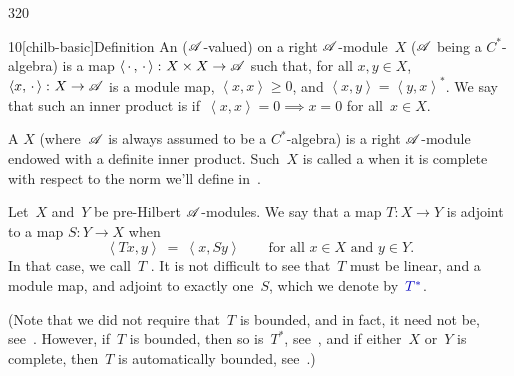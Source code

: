 \begin{parsec}{320}%
\begin{point}{10}[chilb-basic]{Definition}%
	An ($\mathscr{A}$-valued)
	on a right $\mathscr{A}$-module~$X$
($\mathscr{A}$ being a $C^*$-algebra) is a map
$\left<\,\cdot\,,\,\cdot\,\right>\colon X\times X\to\mathscr{A}$%
such that, for all $x,y\in X$,
$\left<x,\,\cdot\,\right>\colon X\to \mathscr{A}$
is a module map, $\left<x,x\right>\geq 0$,
and $\left<x,y\right>=\left<y,x\right>^*$.
We say that such an inner product is %
if~$\left<x,x\right>=0\implies x=0$ for all~$x\in X$.

A %
$X$ (where~$\mathscr{A}$ is always assumed to be a $C^*$-algebra)
is a right $\mathscr{A}$-module endowed with a definite inner product.
Such~$X$ is called
a %
when it is complete
with respect to
the norm we'll define in~.

Let~$X$ and~$Y$ be pre-Hilbert $\mathscr{A}$-modules.
We say that a map $T\colon X\to Y$
is adjoint to a map $S\colon Y\to X$
when
\begin{equation*}
\left<Tx,y\right>\ =\ \left<x,Sy\right>
\qquad \text{for all $x\in X$ and $y\in Y$}.
\end{equation*}
In that case, we call~$T$ .%
It is not difficult to see that~$T$
must be linear, and a module map, and 
adjoint to exactly one~$S$, which we denote by~$\Define{T^*}$.%

(Note that we did not require that~$T$
is bounded, and in fact, it need not be, 
see~.
However, if~$T$ is bounded, then so is~$T^*$, 
see~,
and if either~$X$ or~$Y$ is complete,
then~$T$ is automatically bounded, see~.)


\end{point}
\end{parsec}
